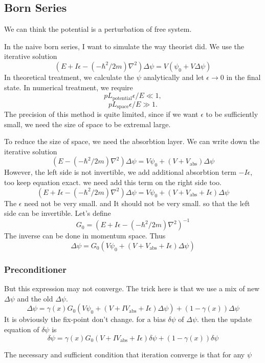 \documentclass[12pt,twoside]{article}
\begin{document}
\subsection{Born Series}
We can think the potential is a perturbation of free system.

In the naive born series, I want to simulate the way theorist did. We use the iterative solution
$$
(E + I\epsilon-(-\hbar^2/2m)\nabla^2)\Delta\psi = V(\psi_0 + V\Delta \psi)
$$
In theoretical treatment, we calculate the $\psi$ analytically and let $\epsilon \rightarrow 0$ in the final state.
In numerical treatment, we require
$$pL_\text{potential} \epsilon/E \ll 1,$$ $$ p L_\text{space}\epsilon/E \gg 1.$$
The precision of this method is quite limited, since if we want $\epsilon$ to be sufficiently small, we need the size of space to be extremal large.


To reduce the size of space, we need the absorbtion layer. We can write down the iterative solution
$$
(E -(-\hbar^2/2m)\nabla^2)\Delta\psi = V\psi_0 + (V+V_\text{abs})\Delta \psi
$$
However, the left side is not invertible, we add additional absorbtion term $-I\epsilon$, too keep equation exact. we need add this term on the right side too.
$$
(E + I\epsilon-(-\hbar^2/2m)\nabla^2)\Delta\psi = V\psi_0 + (V+V_\text{abs} + I\epsilon)\Delta \psi
$$
The $\epsilon$ need not be very small. and It should not be very small. so that the left side can be invertible.
Let's define
$$
G_0 = (E + I\epsilon-(-\hbar^2/2m)\nabla^2)^{-1}
$$
The inverse can be done in momentum space.
Thus
$$
\Delta\psi = G_0(V\psi_0 + (V+V_\text{abs} + I\epsilon)\Delta \psi)
$$

\subsubsection{Preconditioner}
But this expression may not converge. The trick here is that we use a mix of new $\Delta \psi$ and the old $\Delta \psi$.
$$\Delta\psi = \gamma(x) G_0(V\psi_0 + (V+IV_\text{abs} + I\epsilon)\Delta \psi) + (1-\gamma(x))\Delta \psi$$
It is obviously the fix-point don't change. for a bias $\delta\psi$ of $\Delta\psi$. then the update equation of $\delta\psi$ is
$$
\delta\psi = \gamma(x)G_0 (V+IV_\text{abs}+I\epsilon)\delta\psi + (1-\gamma(x))\delta\psi
$$

The necessary and sufficient condition that iteration converge is that for any $\psi$
\end{document}
